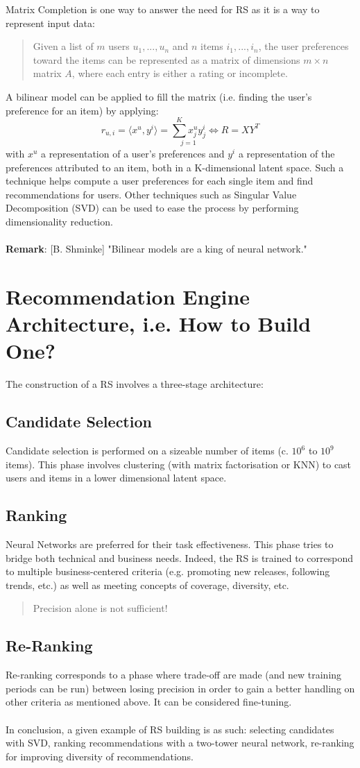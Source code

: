 \documentclass[a4paper]{article}
\begin{document}
Matrix Completion is one way to answer the need for RS as it is a way to represent input data: 
\begin{quote}
Given a list of $m$ users ${u_1, ..., u_n}$ and $n$ items ${i_1, ..., i_n}$, the user preferences toward the items can be represented as a matrix of dimensions $m \times n$ matrix $A$, where each entry is either a rating or incomplete.
\end{quote}
A bilinear model can be applied to fill the matrix (i.e. finding the user’s preference for an item) by applying: $$r_{u, i} = \langle x^u, y^i \rangle= \underset{j=1}{\overset{K}{\sum}x_j^uy_j^i} \Leftrightarrow R = XY^T$$ with $x^u$ a representation of a user's preferences and $y^i$ a representation of the preferences attributed to an item, both in a K-dimensional latent space.
Such a technique helps compute a user preferences for each single item and find recommendations for users. Other techniques such as Singular Value Decomposition (SVD) can be used to ease the process by performing dimensionality reduction.
\\\\
\textbf{Remark}: [B. Shminke] "Bilinear models are a king of neural network."

\section{Recommendation Engine Architecture, i.e. How to Build One?}
The construction of a RS involves a three-stage architecture:

\subsection{Candidate Selection}
Candidate selection is performed on a sizeable number of items (c. $10^6$ to $10^9$ items). This phase involves clustering (with matrix factorisation or KNN) to cast users and items in a lower dimensional latent space.

\subsection{Ranking}
Neural Networks are preferred for their task effectiveness. This phase tries to bridge both technical and business needs. Indeed, the RS is trained to correspond to multiple business-centered criteria (e.g. promoting new releases, following trends, etc.) as well as meeting concepts of coverage, diversity, etc. 
\begin{quote}
Precision alone is not sufficient!
\end{quote}
\subsection{Re-Ranking}
Re-ranking corresponds to a phase where trade-off are made (and new training periods can be run) between losing precision in order to gain a better handling on other criteria as mentioned above. It can be considered fine-tuning.
\\\\
In conclusion, a given example of RS building is as such: selecting candidates with SVD, ranking recommendations with a two-tower neural network, re-ranking for improving diversity of recommendations.
\end{document}
